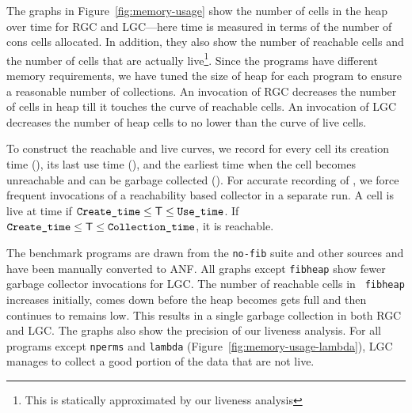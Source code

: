 \documentclass[9pt]{sigplanconf}
\begin{document}
The graphs  in Figure~\ref{fig:memory-usage} show the  number of cells
in the heap over time for RGC and LGC---here time is measured in terms
of the number of cons cells allocated. In addition, they also show the
number of  reachable cells and the  number of cells  that are actually
live\footnote{This   is  statically   approximated  by   our  liveness
  analysis}.  Since  the programs have  different memory requirements,
we have tuned the size of heap for each program to ensure a reasonable
number of  collections. An invocation  of RGC decreases the  number of
cells  in heap  till  it touches  the  curve of  reachable cells.   An
invocation of LGC decreases the number  of heap cells to no lower than
the curve of live cells.

To construct the  reachable and live curves, we  record for every cell
its creation time (\CreateTime), its last use time (\UseTime), and the
earliest time  when the  cell becomes unreachable  and can  be garbage
collected (\CollTime).  For accurate recording of  \CollTime, we force
frequent invocations  of a reachability based collector  in a separate
run.     A    cell   is    live    at    time   \mbox{\exectime}    if
\mbox{$\mbox{{\tt Create\_time}}       \leq       \mbox{\mbox{\sf T}}       \leq
  \mbox{{\tt Use\_time}}$}.       If      \mbox{$\mbox{{\tt Create\_time}}      \leq
  \mbox{\mbox{\sf T}} \leq \mbox{{\tt Collection\_time}}$}, it is reachable.

The benchmark programs are drawn from the {\tt no-fib} suite and other
sources and have been  manually converted to  ANF.  All  graphs  except
 {\tt  fibheap}  show  fewer  garbage
collector  invocations for  LGC. The  number  of reachable  cells in
{\tt
  fibheap} increases  initially, comes  down before the  heap becomes
gets
full and then  continues to remains low.  This results in  a single
garbage
collection in both RGC and LGC.  The graphs also show the precision of
our liveness analysis.  For  all programs  except  {\tt nperms} and
{\tt lambda} (Figure~\ref{fig:memory-usage-lambda}),  LGC
manages to collect a good portion of the data that are not live.
\end{document}
